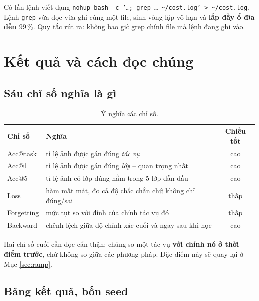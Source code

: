 \documentclass[11pt,a4paper]{article}
\begin{document}
Có lần lệnh viết dạng \texttt{nohup bash -c '\ldots; grep \ldots{} \textasciitilde/cost.log'
> \textasciitilde/cost.log}. Lệnh \texttt{grep} vừa đọc vừa ghi cùng một file, sinh
vòng lặp vô hạn và \textbf{lấp đầy ổ đĩa đến $99\,\%$}. Quy tắc rút ra: không bao
giờ grep chính file mà lệnh đang ghi vào.

\section{Kết quả và cách đọc chúng}

\subsection{Sáu chỉ số nghĩa là gì}

\begin{table}[htbp]
\centering
\caption{Ý nghĩa các chỉ số.}
\begin{tabular}{llc}
\toprule
Chỉ số & Nghĩa & Chiều tốt \\
\midrule
Acc@task   & tỉ lệ ảnh được gán đúng \emph{tác vụ} & cao \\
Acc@1      & tỉ lệ ảnh được gán đúng \emph{lớp} -- quan trọng nhất & cao \\
Acc@5      & tỉ lệ ảnh có lớp đúng nằm trong 5 lớp dẫn đầu & cao \\
Loss       & hàm mất mát, đo cả độ chắc chắn chứ không chỉ đúng/sai & thấp \\
Forgetting & mức tụt so với đỉnh của chính tác vụ đó & thấp \\
Backward   & chênh lệch giữa độ chính xác cuối và ngay sau khi học & cao \\
\bottomrule
\end{tabular}
\end{table}

Hai chỉ số cuối cần đọc cẩn thận: chúng so một tác vụ \textbf{với chính nó ở thời
điểm trước}, chứ không so giữa các phương pháp. Đặc điểm này sẽ quay lại ở Mục
\ref{sec:ramp}.

\subsection{Bảng kết quả, bốn seed}
\end{document}
